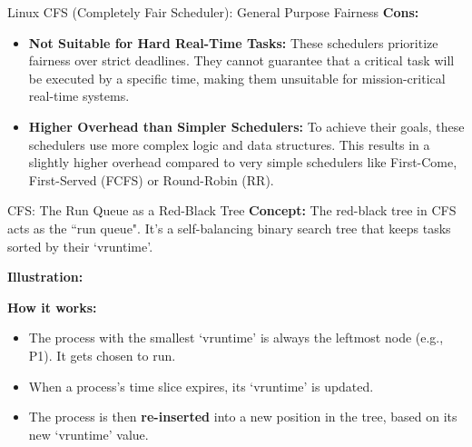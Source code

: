 \documentclass[aspectratio=169,11pt]{beamer}
\begin{document}
\begin{frame}[allowframebreaks]{Linux CFS (Completely Fair Scheduler): General Purpose Fairness}
\vspace{0.5cm}
\textbf{\textcolor{red!70!black}{Cons:}}
\begin{itemize}
    \item \textbf{Not Suitable for Hard Real-Time Tasks:} These schedulers prioritize fairness over strict deadlines. They cannot guarantee that a critical task will be executed by a specific time, making them unsuitable for mission-critical real-time systems.
    \item \textbf{Higher Overhead than Simpler Schedulers:} To achieve their goals, these schedulers use more complex logic and data structures. This results in a slightly higher overhead compared to very simple schedulers like First-Come, First-Served (FCFS) or Round-Robin (RR).
\end{itemize}
\end{frame}

\begin{frame}{CFS: The Run Queue as a Red-Black Tree}
\small
\textbf{Concept:} The red-black tree in CFS acts as the ``run queue". It's a self-balancing binary search tree that keeps tasks sorted by their `vruntime'.

\textbf{Illustration:}

\centering
{}

\vspace{0.5cm}
\textbf{How it works:}

\begin{itemize}
    \item The process with the smallest `vruntime' is always the leftmost node (e.g., P1). It gets chosen to run.
    \item When a process's time slice expires, its `vruntime' is updated.
    \item The process is then \textbf{re-inserted} into a new position in the tree, based on its new `vruntime' value.
\end{itemize}
\end{frame}
\end{document}
